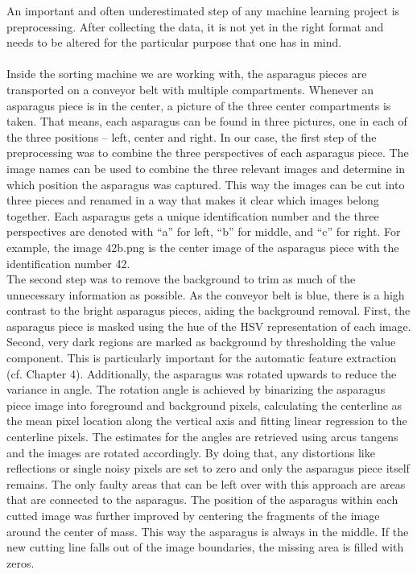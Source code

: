 An important and often underestimated step of any machine learning project is preprocessing. After collecting the data, it is not yet in the right format and needs to be altered for the particular purpose that one has in mind. \\
\\
Inside the sorting machine we are working with, the asparagus pieces are transported on a conveyor belt with multiple compartments. Whenever an asparagus piece is in the center, a picture of the three center compartments is taken. That means, each asparagus can be found in three pictures, one in each of the three positions – left, center and right. In our case, the first step of the preprocessing was to combine the three perspectives of each asparagus piece. The image names can be used to combine the three relevant images and determine in which position the asparagus was captured. This way the images can be cut into three pieces and renamed in a way that makes it clear which images belong together. Each asparagus gets a unique identification number and the three perspectives are denoted with “a” for left, “b” for middle, and “c” for right. For example, the image 42\textunderscore b.png is the center image of the asparagus piece with the identification number 42. \\
The second step was to remove the background to trim as much of the unnecessary information as possible. As the conveyor belt is blue, there is a high contrast to the bright asparagus pieces, aiding the background removal. First, the asparagus piece is masked using the hue of the HSV representation of each image. Second, very dark regions are marked as background by thresholding the value component. This is particularly important for the automatic feature extraction (cf. Chapter 4). Additionally, the asparagus was rotated upwards to reduce the variance in angle. The rotation angle is achieved by binarizing the asparagus piece image into foreground and background pixels, calculating the centerline as the mean pixel location along the vertical axis and fitting linear regression to the centerline pixels. The estimates for the angles are retrieved using arcus tangens and the images are rotated accordingly. By doing that, any distortions like reflections or single noisy pixels are set to zero and only the asparagus piece itself remains. The only faulty areas that can be left over with this approach are areas that are connected to the asparagus. The position of the asparagus within each cutted image was further improved by centering the fragments of the image around the center of mass. This way the asparagus is always in the middle. If the new cutting line falls out of the image boundaries, the missing area is filled with zeros. \\
